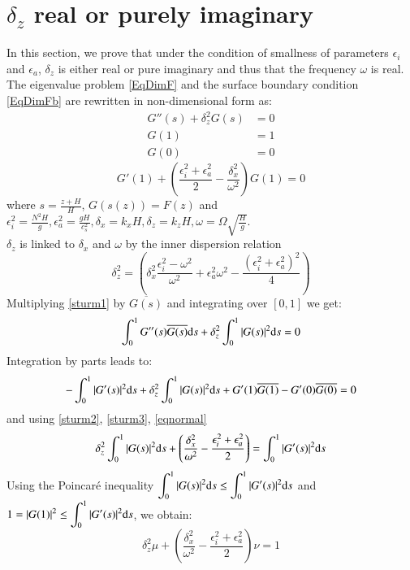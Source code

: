 \appendix
\section{$\delta_z$ real or purely imaginary}
\label{kzreal}
In this section, we prove that under the condition of smallness of parameters $\epsilon_i$ and $\epsilon_a$, $\delta_z$ is either real or pure imaginary and thus that the frequency $\omega$ is real.\\
The eigenvalue problem \ref{EqDimF} and the surface boundary condition \ref{EqDimFb} are rewritten in non-dimensional form as:
\begin{align}
G''(s)
+
\delta_z^2
G(s)&=0 \label{sturm1}\\
G(1)&=1 \label{sturm2}\\
G(0)&=0 \label{sturm3}
\end{align}
\begin{equation}
G'(1)+\left(
\frac{\epsilon_i^2+\epsilon_a^2}{2}-\frac{\delta_x^2}{\omega^2}
\right) G(1)=0
\label{eqnormal}
\end{equation}
where $\displaystyle s=\frac{z+H}{H}$, $G(s(z))=F(z)$ and $\displaystyle \epsilon_i^2=\frac{N^2H}{g}, \epsilon_a^2=\frac{gH}{c_s^2},\delta_x=k_xH,\delta_z=k_zH,\omega=\Omega\sqrt{\frac{H}{g}}$.\\
$\delta_z$ is linked to $\delta_x$ and $\omega$ by the inner dispersion relation
\begin{equation}
\delta_z^2=\left(\delta_x^2\frac{\epsilon_i^2-\omega^2}{\omega^2}
+\epsilon_a^2\omega^2-\frac{(\epsilon_i^2+\epsilon_a^2)^2}{4}\right)
\label{innerannex}
\end{equation}
Multiplying \ref{sturm1} by $\overline{G(s)}$ and integrating over $[0,1]$ we get:
\[
\int_0^1G''(s)\overline{G(s)}{\rm d}s+\delta_z^2\int_0^1|G(s)|^2{\rm d}s=0
\]
Integration by parts leads to:
\[
-\int_0^1|G'(s)|^2{\rm d}s+\delta_z^2\int_0^1|G(s)|^2{\rm d}s+G'(1)\overline{G(1)}-G'(0)\overline{G(0)}=0
\]
and using \ref{sturm2}, \ref{sturm3}, \ref{eqnormal}
\[
\delta_z^2 \int_0^1|G(s)|^2{\rm d}s+\left(\frac{\delta_x^2}{\omega^2}-
\frac{\epsilon_i^2+\epsilon_a^2}{2}
\right)=\int_0^1|G'(s)|^2{\rm d}s
\]
Using the Poincar\'e inequality $\displaystyle \int_0^1|G(s)|^2{\rm d}s\le \int_{0}^1|G'(s)|^2{\rm d}s$ and $\displaystyle 1=|G(1)|^2 \le \int_{0}^1|G'(s)|^2 {\rm d}s$, we obtain:
\begin{equation}
\delta_z^2 \mu + \left(
\frac{\delta_x^2}{\omega^2}-\frac{\epsilon_i^2+\epsilon_a^2}{2}
\right)
\nu = 1
\label{sturm4}
\end{equation}
